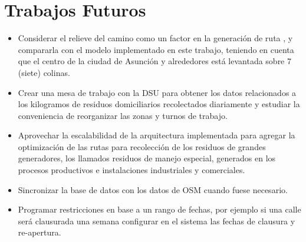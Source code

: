 \section {Trabajos Futuros}

\begin{itemize}
    \item Considerar el relieve del camino como un factor en la generación de ruta \cite{Sulemana2018OptimalMethods}, y compararla con el modelo implementado en este trabajo, teniendo en cuenta que el centro de la ciudad de Asunción y alrededores está levantada sobre 7 (siete) colinas.
    \item Crear una mesa de trabajo con la DSU para obtener los datos relacionados a los kilogramos de residuos domiciliarios recolectados diariamente y estudiar la conveniencia de reorganizar las zonas y turnos de trabajo.
    \item Aprovechar la escalabilidad de la arquitectura implementada para agregar la optimización de las rutas para recolección de los residuos de grandes generadores, los llamados residuos de manejo especial, generados en los procesos productivos e instalaciones industriales y comerciales.
    \item Sincronizar la base de datos con los datos de OSM cuando fuese necesario.
    \item Programar restricciones en base a un rango de fechas, por ejemplo si una calle será clausurada una semana configurar en el sistema las fechas de clausura y re-apertura.
\end{itemize}



